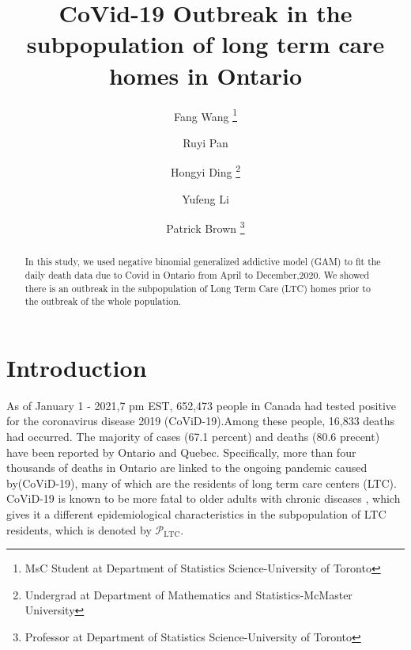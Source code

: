 \documentclass[12pt]{article}
\author{Fang Wang \thanks{MsC Student at Department of Statistics Science-University of Toronto}
\and Ruyi Pan \footnotemark[1]
\and Hongyi Ding \thanks{Undergrad at Department of Mathematics and Statistics-McMaster University}
\and Yufeng Li \footnotemark[2]
\and Patrick Brown \thanks{Professor at Department of Statistics Science-University of Toronto}
}
\title{ \textbf{\huge{CoVid-19 Outbreak in the subpopulation of long term care homes in Ontario}}}
\begin{document}
\newcommand{\RR}{\mathbb{R}}
\newcommand{\ZZ}{\mathbb{Z}}
\newcommand{\NN}{\mathbb{N}}
\newcommand{\QQ}{\mathbb{Q}}
\newcommand{\CC}{\mathbb{C}}
\newcommand{\e}{\mathrm{e}}
\newcommand{\sumi}[2][1]{\sum\limits_{i=#1}^{#2}}
\newcommand{\sumk}[2][1]{\sum\limits_{k=#1}^{#2}}
\newcommand{\sumj}[2][1]{\sum\limits_{j=#1}^{#2}}
\newcommand{\sumx}[2][1]{\sum\limits_{x=#1}^{#2}}
\newcommand{\sumn}[2][1]{\sum\limits_{n=#1}^{#2}}
\newcommand{\prodi}[2][1]{\prod\limits_{i=#1}^{#2}}
\newcommand{\prodk}[2][1]{\prod\limits_{k=#1}^{#2}}
\newcommand{\prodj}[2][1]{\prod\limits_{j=#1}^{#2}}
\newcommand{\E}[2][]{ \mathbb{E}_{#1} \left[ #2 \right]}
\newcommand{\Var}[1]{ \mathrm{Var} \left[ #1 \right]}
\newcommand{\Cov}[1]{ \mathrm{Cov} \left[ #1 \right]}
\renewcommand{\P}[2][]{ \mathbb{P}_{#1} \left( #2 \right)}
\newcommand{\iidis}{\stackrel{iid}{\sim}}
\newcommand{\toP}{\stackrel{P}{\to}}
\newcommand{\toD}{\stackrel{\mathrm{D}}{\to}}
\newcommand{\eqD}{\stackrel{\mathrm{D}}{=}}
\newcommand{\toas}{\stackrel{\mathrm{a.s}}{\to}}
\newcommand{\I}[1]{\mathbb 1_{\{#1\}}}
\newcommand{\ltc}{\mathrm{LTC}}


\theoremstyle{remark}
\newtheorem*{rem}{Remark}
\maketitle


\begin{abstract}
    In this study, we used negative binomial generalized addictive model (GAM) to fit the
    daily death data due to Covid in Ontario from April to December,2020. We showed there is an outbreak in the subpopulation of Long Term Care (LTC) homes prior to the outbreak of the whole population.
\end{abstract}



\section{Introduction} \label{section intro}
As of January 1 - 2021,7 pm EST, 652,473 people in Canada had tested positive for the coronavirus disease 2019 (CoViD-19).Among these people, 16,833 deaths had occurred.
The majority of cases (67.1 percent) and deaths (80.6 precent) have been reported by Ontario and Quebec. Specifically, more than four thousands of deaths in Ontario are linked to the ongoing pandemic caused by(CoViD-19)\cite{dong2020interactive}, many of which are the residents of long term care centers (LTC).
CoViD-19 is known to be more fatal to older adults with chronic diseases \cite{d2020coronavirus}, which gives it a different epidemiological characteristics in the subpopulation of LTC residents,
which is denoted by $\mathcal P_\ltc$.
\end{document}
